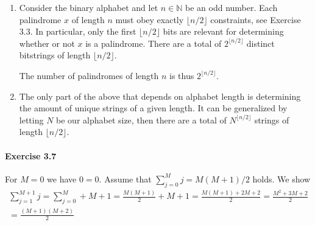 \documentclass{article}
\begin{document}
\begin{enumerate}
    \item Consider the binary alphabet and let $n \in \mathbb{N}$ be an odd number. Each palindrome $x$ of length $n$ must obey exactly $\lfloor n / 2 \rfloor$ constraints, see Exercise 3.3. In particular, only the first $\lfloor n / 2 \rfloor$ bits are relevant for determining whether or not $x$ is a palindrome. There are a total of $2^{\lfloor n / 2 \rfloor}$ distinct bitstrings of length $\lfloor n / 2 \rfloor$.
    
    The number of palindromes of length $n$ is thus $2^{\lfloor n / 2 \rfloor}$.

    \item The only part of the above that depends on alphabet length is determining the amount of unique strings of a given length. It can be generalized by letting $N$ be our alphabet size, then there are a total of $N^{\lfloor n/2 \rfloor}$ strings of length $\lfloor n / 2 \rfloor$.
\end{enumerate}

\paragraph{Exercise 3.7} For $M = 0$ we have $0 = 0$. Assume that $\sum_{j = 0}^{M}j = M(M + 1)/2$ holds. We show
\begin{align*}
    \sum_{j = 1}^{M + 1}j = \sum_{j = 0}^{M} + M + 1 = \frac{M(M + 1)}{2} + M + 1 = \frac{M(M + 1) + 2M + 2}{2} = \frac{M^2 + 3M + 2}{2} \\
    = \frac{(M + 1)(M + 2)}{2}
\end{align*}
\end{document}

